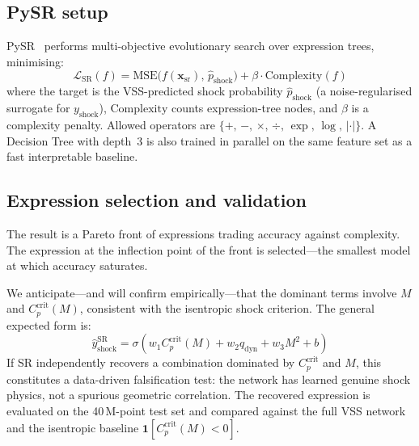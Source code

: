 \documentclass{WCCM-ECCOMAS_2026_Full_Paper}
\begin{document}
\subsection{PySR setup}

PySR~\cite{Cranmer2020} performs multi-objective evolutionary search
over expression trees, minimising:
\begin{equation}
  \mathcal{L}_{\mathrm{SR}}(f) =
    \mathrm{MSE}\!\bigl(f(\mathbf{x}_{\mathrm{sr}}),\,
                        \hat{p}_{\mathrm{shock}}\bigr)
    + \beta\cdot\mathrm{Complexity}(f)
  \label{eq:sr}
\end{equation}
where the target is the VSS-predicted shock probability
$\hat{p}_{\mathrm{shock}}$ (a noise-regularised surrogate for
$y_{\mathrm{shock}}$), $\mathrm{Complexity}$ counts expression-tree
nodes, and $\beta$ is a complexity penalty.  Allowed operators are
$\{+,\,-,\,\times,\,\div,\,\exp,\,\log,\,|\cdot|\}$.  A Decision Tree
with depth~3 is also trained in parallel on the same feature set as a
fast interpretable baseline.

\subsection{Expression selection and validation}

The result is a Pareto front of expressions trading accuracy against
complexity.  The expression at the inflection point of the front is
selected---the smallest model at which accuracy saturates.

We anticipate---and will confirm empirically---that the dominant terms
involve $M$ and $C_{p}^{\mathrm{crit}}(M)$, consistent with the
isentropic shock criterion.  The general expected form is:
\begin{equation}
  \hat{y}_{\mathrm{shock}}^{\mathrm{SR}} =
    \sigma\!\left(w_{1} C_{p}^{\mathrm{crit}}(M)
                 + w_{2} q_{\mathrm{dyn}}
                 + w_{3} M^{2} + b\right)
  \label{eq:srform}
\end{equation}
If SR independently recovers a combination dominated by
$C_{p}^{\mathrm{crit}}$ and $M$, this constitutes a data-driven
falsification test: the network has learned genuine shock physics,
not a spurious geometric correlation.  The recovered expression is
evaluated on the 40\,M-point test set and compared against the full
VSS network and the isentropic baseline
$\mathbf{1}[C_{p}^{\mathrm{crit}}(M) < 0]$.

\end{document}
